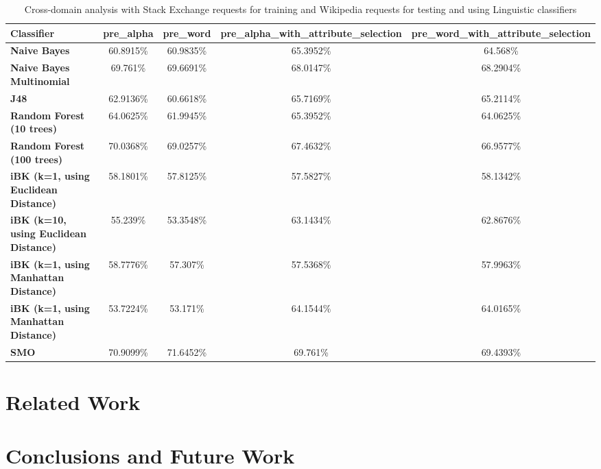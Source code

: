 \documentclass[conference]{IEEEtran}
\begin{document}
\begin{table*}[htbp]
\caption{Cross-domain analysis with Stack Exchange requests for training and Wikipedia requests for testing and using Linguistic classifiers }
\centering
\vspace{5pt}
\begin{tabular}{|l|c|c|c|c|}
\hline
\textbf{Classifier} & \textbf{pre\_alpha} & \textbf{pre\_word} & \textbf{pre\_alpha\_with\_attribute\_selection} & \textbf{pre\_word\_with\_attribute\_selection} \\
\hline\hline
\textbf{Naive Bayes} & 60.8915\% & 60.9835\% & 65.3952\% & 64.568\% \\ 
\hline
\textbf{Naive Bayes Multinomial} & 69.761\% & 69.6691\% & 68.0147\% & 68.2904\% \\ 
\hline
\textbf{J48} & 62.9136\% & 60.6618\% & 65.7169\% & 65.2114\% \\ 
\hline
\textbf{Random Forest (10 trees)} & 64.0625\% & 61.9945\% & 65.3952\% & 64.0625\% \\ 
\hline
\textbf{Random Forest (100 trees)} & 70.0368\% & 69.0257\% & 67.4632\% & 66.9577\% \\ 
\hline
\textbf{iBK (k=1, using Euclidean Distance)} & 58.1801\% & 57.8125\% & 57.5827\% & 58.1342\% \\ 
\hline
\textbf{iBK (k=10, using Euclidean Distance)} & 55.239\% & 53.3548\% & 63.1434\% & 62.8676\% \\ 
\hline
\textbf{iBK (k=1, using Manhattan Distance)} & 58.7776\% & 57.307\% & 57.5368\% & 57.9963\% \\ 
\hline
\textbf{iBK (k=1, using Manhattan Distance)} & 53.7224\% & 53.171\% & 64.1544\% & 64.0165\% \\ 
\hline
\textbf{SMO} & 70.9099\% & 71.6452\% & 69.761\% & 69.4393\% \\ 
\hline
\hline
\end{tabular}
\label{table:cross-domain-stack-Ling}
\end{table*}



\section{Related Work}

\section{Conclusions and Future Work}
\end{document}
